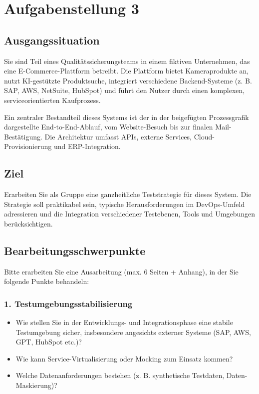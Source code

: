 \newpage
\section{Aufgabenstellung 3}

\subsection{Ausgangssituation}
Sie sind Teil eines Qualitätssicherungsteams in einem fiktiven Unternehmen, das eine E-Commerce-Plattform betreibt. Die Plattform bietet Kameraprodukte an, nutzt KI-gestützte Produktsuche, integriert verschiedene Backend-Systeme (z. B. SAP, AWS, NetSuite, HubSpot) und führt den Nutzer durch einen komplexen, serviceorientierten Kaufprozess.

Ein zentraler Bestandteil dieses Systems ist der in der beigefügten Prozessgrafik dargestellte End-to-End-Ablauf, vom Website-Besuch bis zur finalen Mail-Bestätigung. Die Architektur umfasst APIs, externe Services, Cloud-Provisionierung und ERP-Integration.

\subsection{Ziel}
Erarbeiten Sie als Gruppe eine ganzheitliche Teststrategie für dieses System. Die Strategie soll praktikabel sein, typische Herausforderungen im DevOps-Umfeld adressieren und die Integration verschiedener Testebenen, Tools und Umgebungen berücksichtigen.

\subsection{Bearbeitungsschwerpunkte}
Bitte erarbeiten Sie eine Ausarbeitung (max. 6 Seiten + Anhang), in der Sie folgende Punkte behandeln:

\subsubsection{1. Testumgebungsstabilisierung}
\begin{itemize}
    \item Wie stellen Sie in der Entwicklungs- und Integrationsphase eine stabile Testumgebung sicher, insbesondere angesichts externer Systeme (SAP, AWS, GPT, HubSpot etc.)?
    \item Wie kann Service-Virtualisierung oder Mocking zum Einsatz kommen?
    \item Welche Datenanforderungen bestehen (z. B. synthetische Testdaten, Daten-Maskierung)?
\end{itemize}

